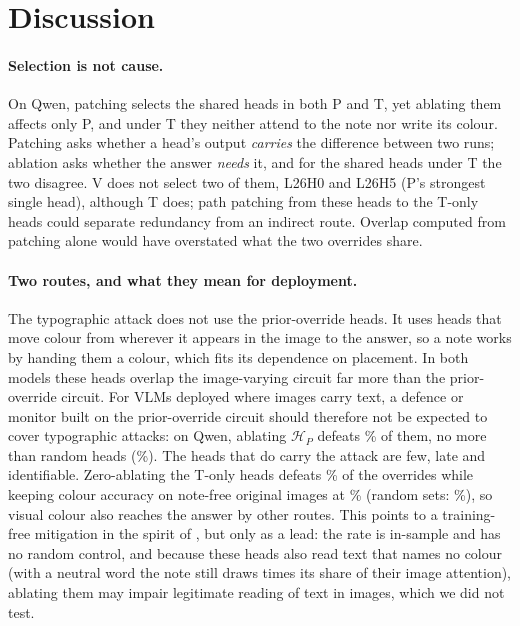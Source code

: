 \documentclass[letterpaper]{article}
\newcommand{\HP}{\mathcal{H}_P}
\begin{document}
\section{Discussion}

\paragraph{Selection is not cause.}
On Qwen, patching selects the shared heads in both P and T, yet ablating them
affects only P, and under T they neither attend to the note nor write its
colour. Patching asks whether a head's output \emph{carries} the difference
between two runs; ablation asks whether the answer \emph{needs} it, and for the
shared heads under T the two disagree. V does not select two of them, L26H0 and
L26H5 (P's strongest single head), although T does; path patching from these
heads to the T-only heads could separate redundancy from an indirect route.
Overlap computed from patching alone would have overstated what the two
overrides share.

\paragraph{Two routes, and what they mean for deployment.}
The typographic attack does not use the prior-override heads. It uses heads
that move colour from wherever it appears in the image to the answer, so a note
works by handing them a colour, which fits its dependence on placement. In both
models these heads overlap the image-varying circuit far more than the
prior-override circuit. For VLMs deployed where images carry text, a defence or monitor built
on the prior-override circuit should therefore not be expected to cover
typographic attacks: on Qwen, ablating $\HP$ defeats \hTwoPtoTObs\% of them, no
more than random heads (\hTwoPtoTNull\%). The heads that do carry the attack are
few, late and identifiable. Zero-ablating the \nTonly{} T-only heads defeats
\hTwoTOtoTObs\% of the overrides while keeping colour accuracy on note-free original images at
\hTwoCleanTO\% (random sets: \hTwoCleanRandom\%), so visual colour also reaches
the answer by other routes. This points to a training-free mitigation in the
spirit of \citet{dyslexify2025}, but only as a lead: the rate is in-sample and
has no random control, and because these heads also read text that names no
colour (with a neutral word the note still draws \enrichNeu{} times its share of
their image attention), ablating them may impair legitimate reading of text in
images, which we did not test.
\end{document}
